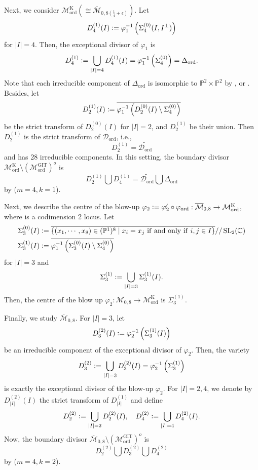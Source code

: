\documentclass[12pt, pdftex]{amsart}
\theoremstyle{plain}
\theoremstyle{definition}
\numberwithin{equation}{section}
\def\C{{\mathbb C}}
\def\P{{\mathbb P}}
\def\SL{\mathop{\mathrm{SL}}\nolimits}
\def\ord{\mathrm{ord}}
\def\GIT{\mathrm{GIT}}
\def\K{\mathrm{K}}
\def\M{\mathcal{M}}
\def\D{\mathscr{D}}
\newcommand{\defeq}{\vcentcolon=}
\begin{document}
    
Next, we consider $\M^{\K}_{\ord}(\cong\overline{\M}_{0,8(\frac{1}{4}+\epsilon)})$.
Let 
\[D_4^{(1)}(I)\defeq\varphi_1^{-1}\left(\Sigma_4^{(0)}(I,I^{\perp})\right)\]
for $|I|=4$.
Then, the exceptional divisor of $\varphi_1$ is
\[D_4^{(1)}\defeq\bigcup_{|I|=4}D_4^{(1)}(I)=\varphi_1^{-1}\left(\Sigma_4^{(0)}\right)=\Delta_{\ord}.\]
Note that each irreducible component of $\Delta_{\ord}$ is isomorphic to $\P^2\times\P^2$ by \cite[Proposition 4.5]{Ha03}, \cite[Remark 6]{MS21} or \cite[Example 2.12]{GKS21}.
Besides, let 
\[D_2^{(1)}(I)\defeq\overline{\varphi_1^{-1}\left(D_2^{(0)}(I)\setminus\Sigma_4^{(0)}\right)}\]
be the strict transform of $D_2^{(0)}(I)$ for $|I|=2$, and $D_2^{(1)}$ be their union.
Then $D_2^{(1)}$ is the strict transform of $\D_{\ord}$, i.e.,
\[D_2^{(1)}=\widetilde{\D_{\ord}}\]
and has 28 irreducible components.
In this setting, the boundary divisor $\M^{\K}_{\ord}\setminus (\M_{\ord}^{\GIT})^o$ is 
\[D^{(1)}_2\bigcup D^{(1)}_4=\widetilde{\D_{\ord}}\bigcup \Delta_{\ord}\]
by \cite[p1134]{KM11} ($m=4, k=1$).

Next, we describe the centre of the blow-up $\varphi_2\defeq\varphi_2'\circ\varphi_{\ord}:\overline{\M}_{0,8}\to\M^{\K}_{\ord}$, 
where is a codimension 2 locus.
Let 
\begin{align*}
\Sigma_3^{(0)}(I)&\defeq\overline{\left\{(x_1,\cdots,x_8)\in (\P^1)^8 \mid x_i=x_j\ \mathrm{if\ and\ only\ if}\ i,j\in I \right\}}//\SL_2(\C)\\
\Sigma_3^{(1)}(I)&\defeq\overline{\varphi_1^{-1}\left(\Sigma_3^{(0)}(I)\setminus\Sigma_4^{(0)}\right)}
\end{align*}
for $|I|=3$ and
\[\Sigma_3^{(1)}\defeq\bigcup_{|I|=3}\Sigma_3^{(1)}(I).\]
Then, the centre of the blow up $\varphi_2:\overline{\M_{0,8}}\to\M_{\ord}^{\K}$ 
is $\Sigma_3^{(1)}$.

Finally, we study $\overline{\M}_{0,8}$.
For $|I|=3$, let 
\[D_3^{(2)}(I)\defeq\varphi_2^{-1}\left(\Sigma_3^{(1)}(I)\right)\]
be an irreducible component of the exceptional divisor of $\varphi_2$.
Then, the variety
\[D_3^{(2)}\defeq\bigcup_{|I|=3}D_3^{(2)}(I)=\varphi_2^{-1}\left(\Sigma_3^{(1)}\right)\]
 is exactly the exceptional divisor of the blow-up $\varphi_2$.
 For $|I|=2,4$, we denote by $D_{|I|}^{(2)}(I)$ the strict transform of $D_{|I|}^{(1)}$ and define 
\[D_2^{(2)}\defeq\bigcup_{|I|=2}D_2^{(2)}(I),\quad D_4^{(2)}\defeq\bigcup_{|I|=4}D_4^{(2)}(I).\]
Now, the boundary divisor  $\overline{\M}_{0,8}\setminus (\M_{\ord}^{\GIT})^o$ 
is
\[D^{(2)}_2\bigcup D^{(2)}_3 \bigcup D^{(2)}_4\]
by \cite[p1134]{KM11} ($m=4, k=2$).
\end{document}
